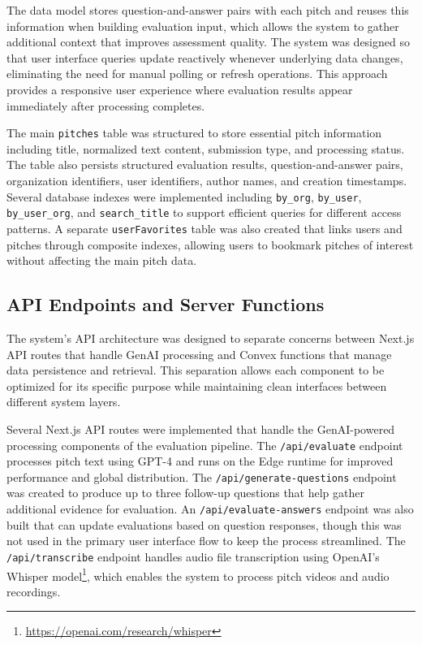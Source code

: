 The data model stores question-and-answer pairs with each pitch and reuses this information when building evaluation input, which allows the system to gather additional context that improves assessment quality. The system was designed so that user interface queries update reactively whenever underlying data changes, eliminating the need for manual polling or refresh operations. This approach provides a responsive user experience where evaluation results appear immediately after processing completes.

The main \texttt{pitches} table was structured to store essential pitch information including title, normalized text content, submission type, and processing status. The table also persists structured evaluation results, question-and-answer pairs, organization identifiers, user identifiers, author names, and creation timestamps. Several database indexes were implemented including \texttt{by\_org}, \texttt{by\_user}, \texttt{by\_user\_org}, and \texttt{search\_title} to support efficient queries for different access patterns. A separate \texttt{userFavorites} table was also created that links users and pitches through composite indexes, allowing users to bookmark pitches of interest without affecting the main pitch data.

\subsection{API Endpoints and Server Functions}\label{subsec:api-and-server}
The system's API architecture was designed to separate concerns between Next.js API routes that handle GenAI processing and Convex functions that manage data persistence and retrieval. This separation allows each component to be optimized for its specific purpose while maintaining clean interfaces between different system layers.

Several Next.js API routes were implemented that handle the GenAI-powered processing components of the evaluation pipeline. The \texttt{/api/evaluate} endpoint processes pitch text using GPT-4 and runs on the Edge runtime for improved performance and global distribution. The \texttt{/api/generate-questions} endpoint was created to produce up to three follow-up questions that help gather additional evidence for evaluation. An \texttt{/api/evaluate-answers} endpoint was also built that can update evaluations based on question responses, though this was not used in the primary user interface flow to keep the process streamlined. The \texttt{/api/transcribe} endpoint handles audio file transcription using OpenAI's Whisper model\footnote{\url{https://openai.com/research/whisper}}, which enables the system to process pitch videos and audio recordings.

